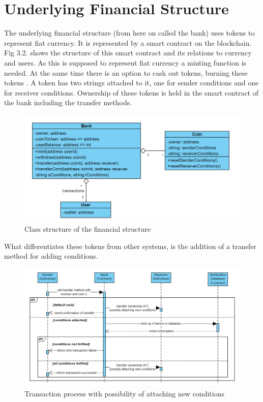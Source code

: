 \section*{Underlying Financial Structure}
The underlying financial structure (from here on called the bank) uses tokens to represent fiat currency. It is represented by a smart contract on the blockchain. Fig 3.2. shows the structure of this smart contract and its relations to currency and users. As this is supposed to represent fiat currency a minting function is needed. At the same time there is an option to cash out tokens, burning these tokens \cite{pattern}. A token has two strings attached to it, one for sender conditions and one for receiver conditions. Ownership of these tokens is held in the smart contract of the bank including the transfer methods.\\
\begin{figure}[H]
    \centering
    \includegraphics[scale=0.45]{figures/financeUML.PNG}  
    \caption{Class structure of the financial structure}
    \label{fig:my_label}
\end{figure}
What differentiates these tokens from other systems, is the addition of a transfer method for adding conditions.
\begin{figure}[H]
    \centering
    \includegraphics[scale=0.45]{figures/transfer.PNG}  
    \caption{Transaction process with possibility of attaching new conditions}
    \label{fig:my_label}
\end{figure}
